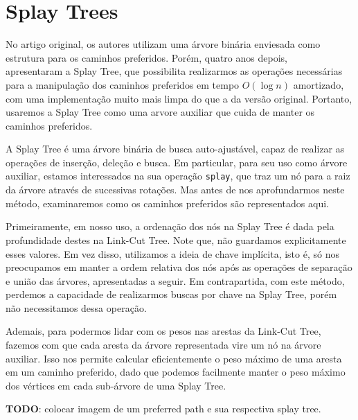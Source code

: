 \section{Splay Trees}
\label{sec:lct-splay-trees}

No artigo original, os autores utilizam uma árvore binária enviesada como estrutura para os caminhos preferidos. Porém, quatro anos depois, ~\citet{10.1145/3828.3835} apresentaram a Splay Tree, que possibilita realizarmos as operações necessárias para a manipulação dos caminhos preferidos em tempo $O(\log n)$ amortizado, com uma implementação muito mais limpa do que a da versão original. Portanto, usaremos a Splay Tree como uma arvore auxiliar que cuida de manter os caminhos preferidos.

A Splay Tree é uma árvore binária de busca auto-ajustável, capaz de realizar as operações de inserção, deleção e busca. Em particular, para seu uso como árvore auxiliar, estamos interessados na sua operação \texttt{splay}, que traz um nó para a raiz da árvore através de sucessivas rotações. Mas antes de nos aprofundarmos neste método, examinaremos como os caminhos preferidos são representados aqui.

Primeiramente, em nosso uso, a ordenação dos nós na Splay Tree é dada pela profundidade destes na Link-Cut Tree. Note que, não guardamos explicitamente esses valores. Em vez disso, utilizamos a ideia de chave implícita, isto é, só nos preocupamos em manter a ordem relativa dos nós após as operações de separação e união das árvores, apresentadas a seguir. Em contrapartida, com este método, perdemos a capacidade de realizarmos buscas por chave na Splay Tree, porém não necessitamos dessa operação.

Ademais, para podermos lidar com os pesos nas arestas da Link-Cut Tree, fazemos com que cada aresta da árvore representada vire um nó na árvore auxiliar. Isso nos permite calcular eficientemente o peso máximo de uma aresta em um caminho preferido, dado que podemos facilmente manter o peso máximo dos vértices em cada sub-árvore de uma Splay Tree.

\begin{center}
    \textbf{TODO}: colocar imagem de um preferred path e sua respectiva splay tree.
\end{center}

